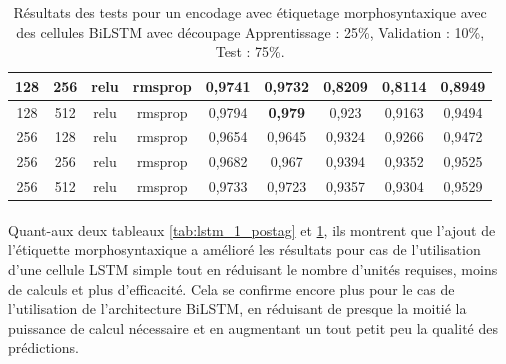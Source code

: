 \begin{table}[H]
{\begin{tabular}{|c|c|c|c|c|c|c|c|c|}
				128 & 256 & relu & rmsprop & 0,9741 & 0,9732 & 0,8209 & 0,8114 & 0,8949 \\ \hline
				128 & 512 & relu & rmsprop & 0,9794 & \textbf{0,979} & 0,923 & 0,9163 & 0,9494 \\ \hline
				256 & 128 & relu & rmsprop & 0,9654 & 0,9645 & 0,9324 & 0,9266 & 0,9472 \\ \hline
				256 & 256 & relu & rmsprop & 0,9682 & 0,967 & 0,9394 & 0,9352 & 0,9525 \\ \hline
				256 & 512 & relu & rmsprop & 0,9733 & 0,9723 & 0,9357 & 0,9304 & 0,9529 \\ \hline
			\end{tabular}%
		}
		\caption{Résultats des tests pour un encodage avec étiquetage morphosyntaxique avec des cellules BiLSTM avec découpage Apprentissage : 25\%, Validation : 10\%, Test : 75\%.}
		\label{tab:bilstm_1_postag}
	\end{table}
	
	\paragraph{}
	Quant-aux deux tableaux \ref{tab:lstm_1_postag} et \ref{tab:bilstm_1_postag}, ils montrent que l'ajout de l'étiquette morphosyntaxique a amélioré les résultats pour cas de l'utilisation d'une cellule LSTM simple tout en réduisant le nombre d'unités requises, moins de calculs et plus d'efficacité. Cela se confirme encore plus pour le cas de l'utilisation de l'architecture BiLSTM, en réduisant de presque la moitié la puissance de calcul nécessaire et en augmentant un tout petit peu la qualité des prédictions.
	
	
	
